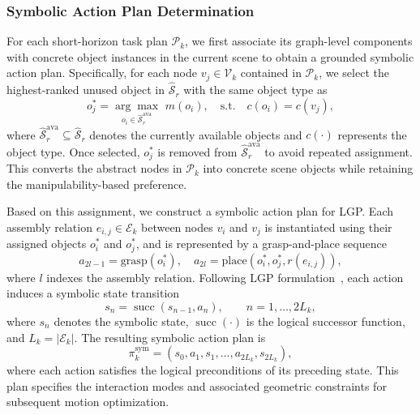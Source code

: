 \documentclass[letterpaper, 10 pt, conference]{ieeeconf}  %
\begin{document}
\subsubsection{Symbolic Action Plan Determination}
For each short-horizon task plan $\mathcal{P}_k$, we first associate its graph-level components with concrete object instances in the current scene to obtain a grounded symbolic action plan.
Specifically, for each node $v_j \in \mathcal{V}_k$ contained in $\mathcal{P}_k$, we select the highest-ranked unused object in $\hat{\mathcal{S}}_r$ with the same object type as
\begin{equation}
o_j^{*} = \underset{o_i\in\hat{\mathcal{S}}_{r}^{\mathrm{ava}}}{\arg\max} \,\, m(o_i), \quad \mathrm{s.t.}\quad c(o_i)=c(v_j),
\end{equation}
where $\hat{\mathcal{S}}_{r}^{\mathrm{ava}} \subseteq \hat{\mathcal{S}}_r$ denotes the currently available objects and $c(\cdot)$ represents the object type. 
Once selected, $o_j^{*}$ is removed from $\hat{\mathcal{S}}_{r}^{\mathrm{ava}}$ to avoid repeated assignment.
This converts the abstract nodes in $\mathcal{P}_k$ into concrete scene objects while retaining the manipulability-based preference.

Based on this assignment, we construct a symbolic action plan for LGP. 
Each assembly relation $e_{i,j} \in \mathcal{E}_k$ between nodes $v_i$ and $v_j$ is instantiated using their assigned objects $o_i^{*}$ and $o_j^{*}$, and is represented by a grasp-and-place sequence
\begin{equation}
a_{2l-1}=\mathrm{grasp}(o_i^{*}), \quad a_{2l}=\mathrm{place}\left(o_i^{*},o_j^{*},r(e_{i,j}) \right),
\end{equation}
where $l$ indexes the assembly relation.
Following LGP formulation~\cite{marc2015LGP}, each action induces a symbolic state transition
\begin{equation}
s_n=\operatorname{succ}(s_{n-1},a_n), \qquad n=1,\ldots,2L_k, \label{eq:lgp_symbolic_transition}
\end{equation}
where $s_n$ denotes the symbolic state, $\operatorname{succ}(\cdot)$ is the logical successor function, and $L_k=|\mathcal{E}_k|$. 
The resulting symbolic action plan is
\begin{equation}
\pi_k^{\mathrm{sym}}=(s_0,a_1,s_1,\ldots,a_{2L_k},s_{2L_k}),
\label{eq:lgp_symbolic_plan}
\end{equation}
where each action satisfies the logical preconditions of its preceding state. 
This plan specifies the interaction modes and associated geometric constraints for subsequent motion optimization.
\end{document}
